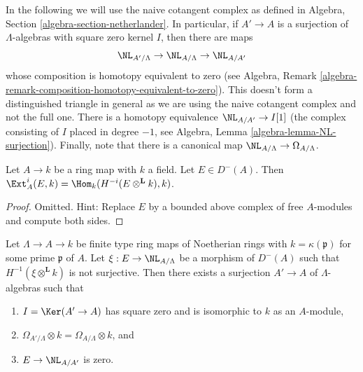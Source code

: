 \medskip\noindent
In the following we will use the naive cotangent complex as
defined in Algebra, Section \ref{algebra-section-netherlander}.
In particular, if $A' \to A$ is a surjection of $\Lambda$-algebras
with square zero kernel $I$, then there are maps
$$
\NL_{A'/\Lambda} \to \NL_{A/\Lambda} \to \NL_{A/A'}
$$
whose composition is homotopy equivalent to zero (see
Algebra, Remark \ref{algebra-remark-composition-homotopy-equivalent-to-zero}).
This doesn't form a distinguished triangle in general as we are using
the naive cotangent complex and not the full one.
There is a homotopy equivalence $\NL_{A/A'} \to I[1]$ (the complex
consisting of $I$ placed in degree $-1$, see
Algebra, Lemma \ref{algebra-lemma-NL-surjection}).
Finally, note that there is a canonical map
$\NL_{A/\Lambda} \to \Omega_{A/\Lambda}$.

\begin{lemma}
\label{lemma-compute-ext-into-field}
Let $A \to k$ be a ring map with $k$ a field. Let $E \in D^-(A)$.
Then $\Ext^i_A(E, k) = \Hom_k(H^{-i}(E \otimes^\mathbf{L} k), k)$.
\end{lemma}

\begin{proof}
Omitted. Hint: Replace $E$ by a bounded above complex of free $A$-modules
and compute both sides.
\end{proof}

\begin{lemma}
\label{lemma-construct-essential-surjection}
Let $\Lambda \to A \to k$ be finite type ring maps of Noetherian rings with
$k = \kappa(\mathfrak p)$ for some prime $\mathfrak p$ of $A$. Let
$\xi : E \to \NL_{A/\Lambda}$ be a morphism of $D^{-}(A)$ such that
$H^{-1}(\xi \otimes^{\mathbf{L}} k)$ is not surjective.
Then there exists a surjection $A' \to A$ of $\Lambda$-algebras
such that
\begin{enumerate}
\item[(a)] $I = \Ker(A' \to A)$ has square zero and is isomorphic to $k$
as an $A$-module,
\item[(b)] $\Omega_{A'/\Lambda} \otimes k = \Omega_{A/\Lambda} \otimes k$, and
\item[(c)] $E \to \NL_{A/A'}$ is zero.
\end{enumerate}
\end{lemma}

